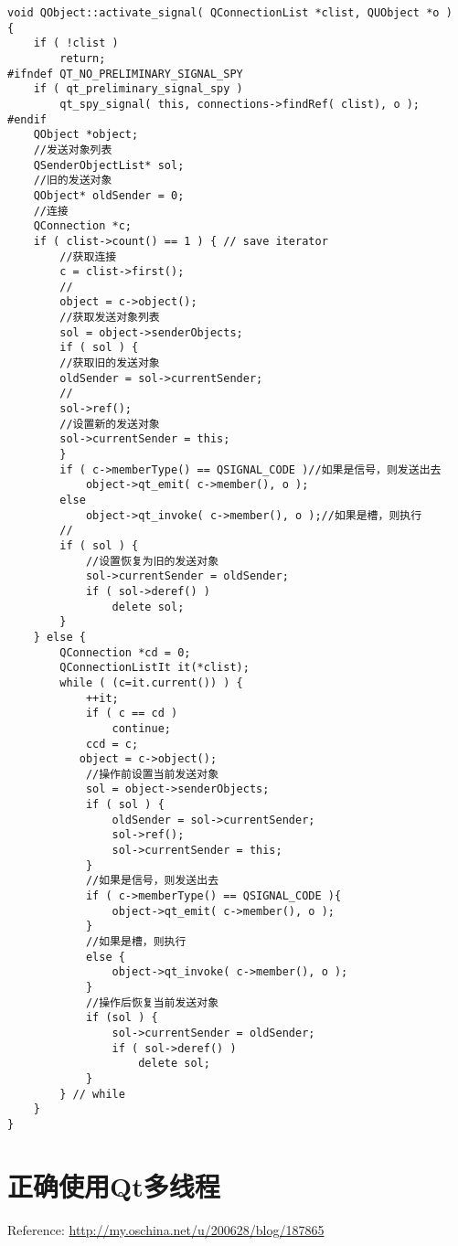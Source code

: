 \documentclass[9pt,b5paper]{article}
\begin{document}
\begin{enumerate}
\begin{lstlisting}
void QObject::activate_signal( QConnectionList *clist, QUObject *o )   {  
    if ( !clist )  
	    return;  
#ifndef QT_NO_PRELIMINARY_SIGNAL_SPY  
    if ( qt_preliminary_signal_spy )  
	    qt_spy_signal( this, connections->findRef( clist), o );  
#endif  
    QObject *object;  
    //发送对象列表  
    QSenderObjectList* sol;  
    //旧的发送对象  
    QObject* oldSender = 0;  
    //连接  
    QConnection *c;  
    if ( clist->count() == 1 ) { // save iterator  
	    //获取连接  
	    c = clist->first();  
	    //  
	    object = c->object();  
	    //获取发送对象列表  
	    sol = object->senderObjects;  
	    if ( sol ) {  
		//获取旧的发送对象  
		oldSender = sol->currentSender;  
		//  
		sol->ref();  
		//设置新的发送对象  
		sol->currentSender = this;  
	    }  
	    if ( c->memberType() == QSIGNAL_CODE )//如果是信号，则发送出去  
		    object->qt_emit( c->member(), o );  
	    else  
		    object->qt_invoke( c->member(), o );//如果是槽，则执行  
	    //       
	    if ( sol ) {  
		    //设置恢复为旧的发送对象  
		    sol->currentSender = oldSender;  
		    if ( sol->deref() )  
			    delete sol;  
	    }  
    } else {  
	    QConnection *cd = 0;  
	    QConnectionListIt it(*clist);  
	    while ( (c=it.current()) ) {  
		    ++it;  
		    if ( c == cd )  
			    continue;  
		    ccd = c;   
		   object = c->object();  
		    //操作前设置当前发送对象  
		    sol = object->senderObjects;  
		    if ( sol ) {  
			    oldSender = sol->currentSender;  
			    sol->ref();  
			    sol->currentSender = this;  
		    }  
		    //如果是信号，则发送出去  
		    if ( c->memberType() == QSIGNAL_CODE ){  
			    object->qt_emit( c->member(), o );  
		    }  
		    //如果是槽，则执行  
		    else {  
			    object->qt_invoke( c->member(), o );  
		    }  
		    //操作后恢复当前发送对象  
		    if (sol ) {  
			    sol->currentSender = oldSender;  
			    if ( sol->deref() )  
				    delete sol;  
		    }  
	    } // while  
    }  
}
\end{lstlisting}
\end{enumerate}

\section{正确使用Qt多线程}
\label{sec-5}
Reference: \url{http://my.oschina.net/u/200628/blog/187865}
\end{document}
